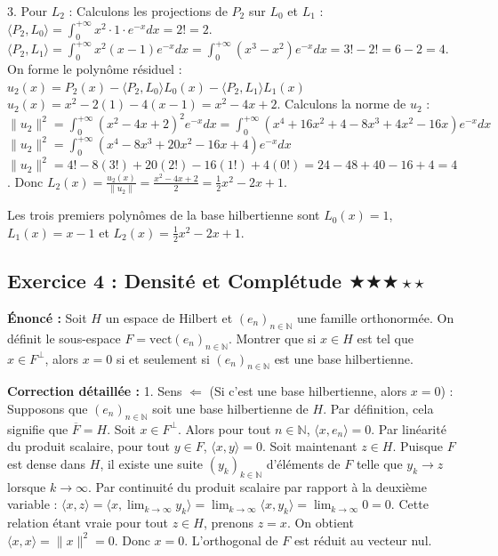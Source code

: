 \documentclass[11pt,a4paper]{article}
\begin{document}
3. Pour $L_2$ :
   Calculons les projections de $P_2$ sur $L_0$ et $L_1$ :
   $\langle P_2, L_0 \rangle = \int_0^{+\infty} x^2 \cdot 1 \cdot e^{-x} dx = 2! = 2$.
   $\langle P_2, L_1 \rangle = \int_0^{+\infty} x^2(x-1) e^{-x} dx = \int_0^{+\infty} (x^3 - x^2) e^{-x} dx = 3! - 2! = 6 - 2 = 4$.
   On forme le polynôme résiduel :
   $u_2(x) = P_2(x) - \langle P_2, L_0 \rangle L_0(x) - \langle P_2, L_1 \rangle L_1(x)$
   $u_2(x) = x^2 - 2(1) - 4(x-1) = x^2 - 4x + 2$.
   Calculons la norme de $u_2$ :
   $\|u_2\|^2 = \int_0^{+\infty} (x^2 - 4x + 2)^2 e^{-x} dx = \int_0^{+\infty} (x^4 + 16x^2 + 4 - 8x^3 + 4x^2 - 16x) e^{-x} dx$
   $\|u_2\|^2 = \int_0^{+\infty} (x^4 - 8x^3 + 20x^2 - 16x + 4) e^{-x} dx$
   $\|u_2\|^2 = 4! - 8(3!) + 20(2!) - 16(1!) + 4(0!) = 24 - 48 + 40 - 16 + 4 = 4$.
   Donc $L_2(x) = \frac{u_2(x)}{\|u_2\|} = \frac{x^2 - 4x + 2}{2} = \frac{1}{2}x^2 - 2x + 1$.

Les trois premiers polynômes de la base hilbertienne sont $L_0(x) = 1$, $L_1(x) = x - 1$ et $L_2(x) = \frac{1}{2}x^2 - 2x + 1$.


\subsection*{Exercice 4 : Densité et Complétude $\bigstar\bigstar\bigstar\star\star$}

\textbf{Énoncé :}
Soit $H$ un espace de Hilbert et $(e_n)_{n \in \mathbb{N}}$ une famille orthonormée. On définit le sous-espace $F = \text{vect}(e_n)_{n \in \mathbb{N}}$.
Montrer que si $x \in H$ est tel que $x \in F^\perp$, alors $x = 0$ si et seulement si $(e_n)_{n \in \mathbb{N}}$ est une base hilbertienne.

\textbf{Correction détaillée :}
1. \textit{}Sens $\Leftarrow$ (Si c'est une base hilbertienne, alors $x=0$) :\textit{}
   Supposons que $(e_n)_{n \in \mathbb{N}}$ soit une base hilbertienne de $H$. Par définition, cela signifie que $\overline{F} = H$.
   Soit $x \in F^\perp$. Alors pour tout $n \in \mathbb{N}$, $\langle x, e_n \rangle = 0$.
   Par linéarité du produit scalaire, pour tout $y \in F$, $\langle x, y \rangle = 0$.
   Soit maintenant $z \in H$. Puisque $F$ est dense dans $H$, il existe une suite $(y_k)_{k \in \mathbb{N}}$ d'éléments de $F$ telle que $y_k \to z$ lorsque $k \to \infty$.
   Par continuité du produit scalaire par rapport à la deuxième variable :
   $\langle x, z \rangle = \langle x, \lim_{k \to \infty} y_k \rangle = \lim_{k \to \infty} \langle x, y_k \rangle = \lim_{k \to \infty} 0 = 0$.
   Cette relation étant vraie pour tout $z \in H$, prenons $z = x$. On obtient $\langle x, x \rangle = \|x\|^2 = 0$.
   Donc $x = 0$. L'orthogonal de $F$ est réduit au vecteur nul.
\end{document}
